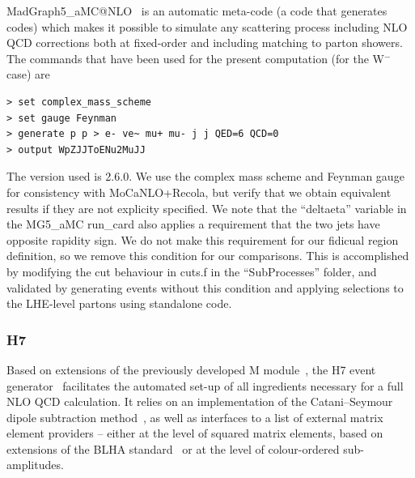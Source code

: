 \documentclass[11pt]{cernrep}
\newcommand{\Herwig}{H\protect\scalebox{0.8}{ERWIG}7\xspace}
\newcommand{\Matchbox}{M\protect\scalebox{0.8}{ATCHBOX}\xspace}
\begin{document}
{\sc MadGraph5\_aMC@NLO}~\cite{Alwall:2014hca} is an automatic meta-code (a code that generates codes) which makes it possible to simulate any scattering process
      including NLO QCD corrections both at fixed-order and including matching to parton showers. 
      The commands that have been used for the present computation (for the W$^{-}$ case) are 
\begin{verbatim}
> set complex_mass_scheme
> set gauge Feynman
> generate p p > e- ve~ mu+ mu- j j QED=6 QCD=0
> output WpZJJToENu2MuJJ
\end{verbatim}
  The version used is 2.6.0. We use the complex mass scheme and Feynman gauge for consistency with MoCaNLO+Recola, but 
  verify that we obtain equivalent results if they are not explicity specified.
  We note that the ``deltaeta'' variable in the MG5\_aMC run\_card also applies a requirement that the two jets
  have opposite rapidity sign. We do not make this requirement for our fidicual region definition, so we remove this condition for our comparisons.
  This is accomplished by modifying the cut behaviour in cuts.f in the ``SubProcesses'' folder, and validated by
  generating events without this condition and applying selections to the LHE-level partons using standalone code.
  
\subsubsection*{\protect\Herwig \label{vbs_herwig}}

Based on extensions of the previously developed \Matchbox
module~\cite{Platzer:2011bc}, the \Herwig event generator~\cite{Bellm:2015jjp,Bahr:2008pv} facilitates the automated set-up of all ingredients necessary for a full NLO QCD calculation.
It relies on an implementation of the Catani--Seymour dipole
subtraction method~\cite{Catani:1996vz,Catani:2002hc}, as well as
interfaces to a list of external matrix element providers -- either
at the level of squared matrix elements, based on extensions of the
BLHA standard~\cite{Binoth:2010xt,Alioli:2013nda,Andersen:2014efa} or
at the level of colour-ordered sub-amplitudes.
\end{document}
